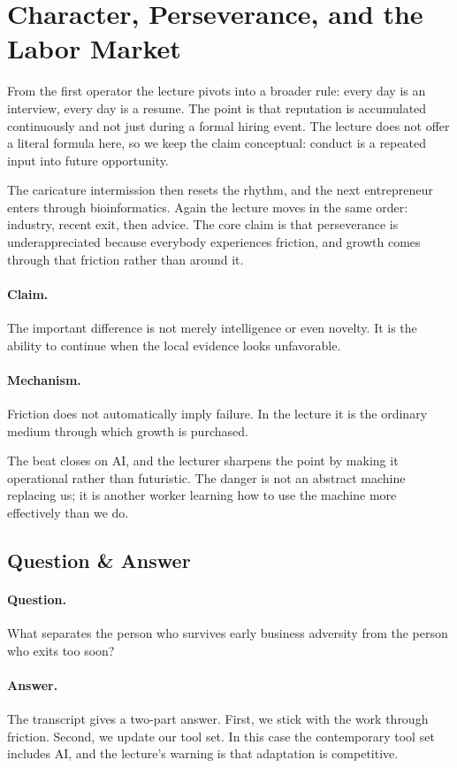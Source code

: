 \section{Character, Perseverance, and the Labor Market}

From the first operator the lecture pivots into a broader rule: every day is an interview, every day is a resume. The point is that reputation is accumulated continuously and not just during a formal hiring event. The lecture does not offer a literal formula here, so we keep the claim conceptual: conduct is a repeated input into future opportunity.

The caricature intermission then resets the rhythm, and the next entrepreneur enters through bioinformatics. Again the lecture moves in the same order: industry, recent exit, then advice. The core claim is that perseverance is underappreciated because everybody experiences friction, and growth comes through that friction rather than around it.

\paragraph{Claim.} The important difference is not merely intelligence or even novelty. It is the ability to continue when the local evidence looks unfavorable.

\paragraph{Mechanism.} Friction does not automatically imply failure. In the lecture it is the ordinary medium through which growth is purchased.

The beat closes on AI, and the lecturer sharpens the point by making it operational rather than futuristic. The danger is not an abstract machine replacing us; it is another worker learning how to use the machine more effectively than we do.

\subsection{Question \& Answer}

\paragraph{Question.} What separates the person who survives early business adversity from the person who exits too soon?

\paragraph{Answer.} The transcript gives a two-part answer. First, we stick with the work through friction. Second, we update our tool set. In this case the contemporary tool set includes AI, and the lecture's warning is that adaptation is competitive.

